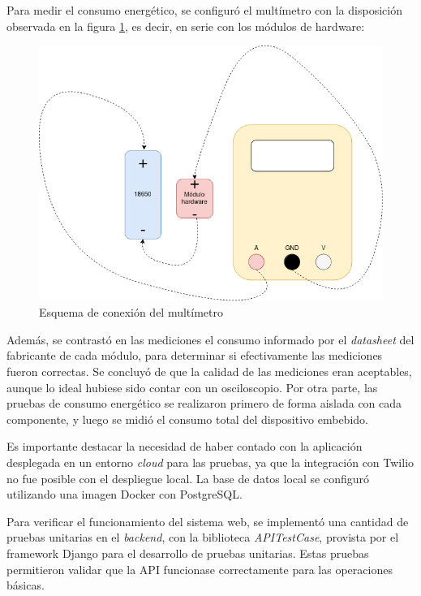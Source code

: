 Para medir el consumo energético, se configuró el multímetro con la disposición observada en la figura \ref{fig:pruebas:multimetro}, es decir, en serie con los módulos de hardware:

\begin{figure}[H]
	\centering
	\includegraphics[width=1\textwidth]{./Figures/multimetro.png}
	\caption{Esquema de conexión del multímetro}
	\label{fig:pruebas:multimetro}
\end{figure}

Además, se contrastó en las mediciones el consumo informado por el \textit{datasheet} del fabricante de cada módulo, para determinar si efectivamente las mediciones fueron correctas. Se concluyó de que la calidad de las mediciones eran aceptables, aunque lo ideal hubiese sido contar con un osciloscopio. Por otra parte, las pruebas de consumo energético se realizaron primero de forma aislada con cada componente, y luego se midió el consumo total del dispositivo embebido. 

Es importante destacar la necesidad de haber contado con la aplicación desplegada en un entorno \textit{cloud} para las pruebas, ya que la integración con Twilio no fue posible con el despliegue local. La base de datos local se configuró utilizando una imagen Docker con PostgreSQL\citep{DOCKER:2}.

Para verificar el funcionamiento del sistema web, se implementó una cantidad de pruebas unitarias en el \textit{backend}, con la biblioteca \textit{APITestCase}, provista por el framework Django para el desarrollo de pruebas unitarias\citep{DJANGO:13}. Estas pruebas permitieron validar que la API funcionase correctamente para las operaciones básicas.

